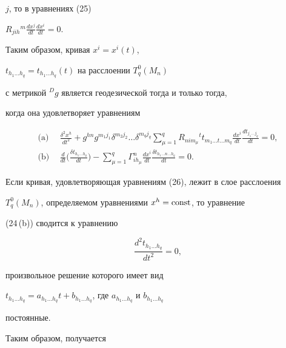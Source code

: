 $j$, то в уравнениях (25) \


$R_{jih}{}^m\frac{dx^j}{dt}\frac{dx^i}{dt}=0$.


Таким образом, кривая  $x^i=x^i(t)$,


$t_{h_1\dotsc h_q}=t_{h_1\dotsc h_q}(t)$ на расслоении $T^0_q(M_n)$


с метрикой ${}^{D}g$ является геодезической тогда и только тогда,


когда она удовлетворяет уравнениям


\begin{equation}


\begin{split}


\text{(a)} \ \ &\frac{\delta^2x^h}{dt^2}+g^{hn}g^{m_1j_1}\delta^{m_2j_2}\dotsc


\delta^{m_q j_q}\sum\limits^q_{\mu=1}R_{nim_\mu}{}^t


t_{m_1\dotsc t\dotsc m_q}\frac{dx^i}{dt}


\frac{dt_{j_1\dotsc j_q}}{dt}=0, \\


\text{(b)} \ \ &\frac{d}{dt}\big(\frac{\delta t_{h_1\dotsc h_q}}{dt}\big)


-\sum\limits^q_{\mu=1}\Gamma^n_{ih_\mu}\frac{dx^i}{dt}


\frac{\delta t_{h_1\dotsc n\dotsc h_q}}{dt}=0.


\end{split}


\end{equation}





Если кривая, удовлетворяющая уравнениям (26), лежит в слое расслоения


$T^0_q(M_n)$, определяемом уравнениями $x^h=\operatorname{const}$, то уравнение


(24\,(b)) сводится к уравнению


$$


\frac{d^2t_{h_1\dotsc h_q}}{dt^2}=0,


$$


произвольное решение которого имеет вид


$t_{h_1\dotsc h_q}=a_{h_1\dotsc h_q}t+


b_{{h_1\dotsc h_q}}$, где $a_{h_1\dotsc h_q}$ и $b_{h_1\dotsc h_q}$


постоянные.


Таким образом, получается





